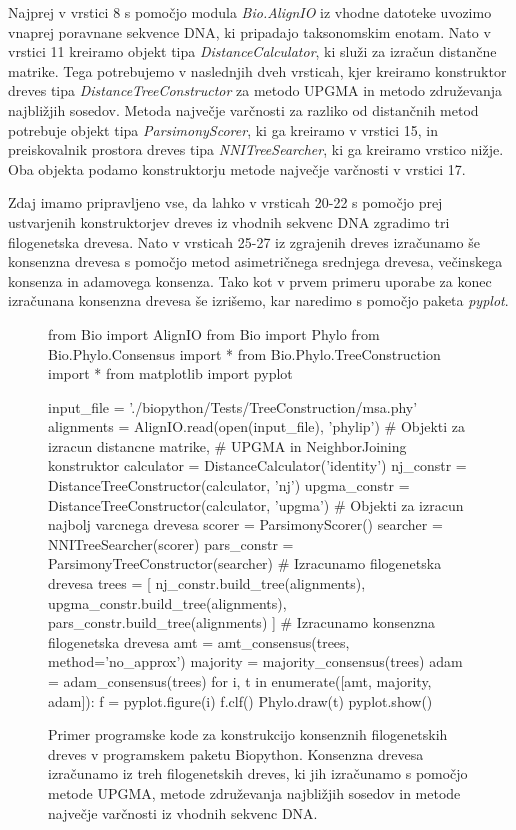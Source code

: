 \documentclass[a4paper, 12pt]{book}
\begin{document}

Najprej v vrstici 8 s pomočjo modula {\it Bio.AlignIO} iz vhodne datoteke uvozimo
vnaprej poravnane sekvence DNA, ki pripadajo taksonomskim enotam. Nato v vrstici 11
kreiramo objekt tipa {\it DistanceCalculator}, ki služi za izračun distančne matrike. Tega
potrebujemo v naslednjih dveh vrsticah, kjer kreiramo konstruktor dreves tipa 
{\it DistanceTreeConstructor} za metodo UPGMA in metodo združevanja najbližjih sosedov.
Metoda največje varčnosti za razliko od distančnih metod potrebuje objekt tipa
{\it ParsimonyScorer}, ki ga kreiramo v vrstici 15, in preiskovalnik prostora 
dreves tipa {\it NNITreeSearcher}, ki ga kreiramo vrstico nižje. Oba objekta podamo
konstruktorju metode največje varčnosti v vrstici 17.

Zdaj imamo pripravljeno vse, da lahko v vrsticah 20-22 s pomočjo prej ustvarjenih 
konstruktorjev dreves iz vhodnih sekvenc DNA zgradimo tri filogenetska drevesa. 
Nato v vrsticah 25-27 iz zgrajenih dreves izračunamo še konsenzna drevesa s 
pomočjo metod asimetričnega srednjega drevesa, večinskega konsenza in adamovega konsenza.
Tako kot v prvem primeru uporabe za konec izračunana konsenzna drevesa še izrišemo, 
kar naredimo s pomočjo paketa {\it pyplot}.


\begin{figure}
\begin{python}
from Bio import AlignIO
from Bio import Phylo
from Bio.Phylo.Consensus import *
from Bio.Phylo.TreeConstruction import *
from matplotlib import pyplot

input_file = './biopython/Tests/TreeConstruction/msa.phy'
alignments = AlignIO.read(open(input_file), 'phylip')
# Objekti za izracun distancne matrike,
# UPGMA in NeighborJoining konstruktor
calculator = DistanceCalculator('identity')
nj_constr = DistanceTreeConstructor(calculator, 'nj')
upgma_constr = DistanceTreeConstructor(calculator, 'upgma')
# Objekti za izracun najbolj varcnega drevesa
scorer = ParsimonyScorer()
searcher = NNITreeSearcher(scorer)
pars_constr = ParsimonyTreeConstructor(searcher)
# Izracunamo filogenetska drevesa
trees = [
    nj_constr.build_tree(alignments),
    upgma_constr.build_tree(alignments),
    pars_constr.build_tree(alignments)
]
# Izracunamo konsenzna filogenetska drevesa
amt = amt_consensus(trees, method='no_approx')
majority = majority_consensus(trees)
adam = adam_consensus(trees)
for i, t in enumerate([amt, majority, adam]):
    f = pyplot.figure(i)
    f.clf()
    Phylo.draw(t)
    pyplot.show()
\end{python}
\caption{
Primer programske kode za konstrukcijo konsenznih filogenetskih dreves v
programskem paketu Biopython. Konsenzna drevesa izračunamo iz treh 
filogenetskih dreves, ki jih izračunamo s pomočjo metode UPGMA, metode združevanja
najbližjih sosedov in metode največje varčnosti iz vhodnih sekvenc DNA. 
}
\label{phylo-trees-example}
\end{figure}
\end{document}
